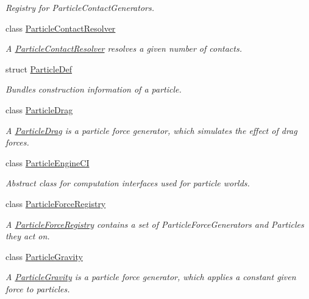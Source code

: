 \begin{DoxyCompactItemize}
\begin{DoxyCompactList}\small\item\em Registry for Particle\+Contact\+Generators. \end{DoxyCompactList}\item 
class \mbox{\hyperlink{classr3_1_1_particle_contact_resolver}{Particle\+Contact\+Resolver}}
\begin{DoxyCompactList}\small\item\em A \mbox{\hyperlink{classr3_1_1_particle_contact_resolver}{Particle\+Contact\+Resolver}} resolves a given number of contacts. \end{DoxyCompactList}\item 
struct \mbox{\hyperlink{structr3_1_1_particle_def}{Particle\+Def}}
\begin{DoxyCompactList}\small\item\em Bundles construction information of a particle. \end{DoxyCompactList}\item 
class \mbox{\hyperlink{classr3_1_1_particle_drag}{Particle\+Drag}}
\begin{DoxyCompactList}\small\item\em A \mbox{\hyperlink{classr3_1_1_particle_drag}{Particle\+Drag}} is a particle force generator, which simulates the effect of drag forces. \end{DoxyCompactList}\item 
class \mbox{\hyperlink{classr3_1_1_particle_engine_c_i}{Particle\+Engine\+CI}}
\begin{DoxyCompactList}\small\item\em Abstract class for computation interfaces used for particle worlds. \end{DoxyCompactList}\item 
class \mbox{\hyperlink{classr3_1_1_particle_force_registry}{Particle\+Force\+Registry}}
\begin{DoxyCompactList}\small\item\em A \mbox{\hyperlink{classr3_1_1_particle_force_registry}{Particle\+Force\+Registry}} contains a set of Particle\+Force\+Generators and Particles they act on. \end{DoxyCompactList}\item 
class \mbox{\hyperlink{classr3_1_1_particle_gravity}{Particle\+Gravity}}
\begin{DoxyCompactList}\small\item\em A \mbox{\hyperlink{classr3_1_1_particle_gravity}{Particle\+Gravity}} is a particle force generator, which applies a constant given force to particles. \end{DoxyCompactList}\item 

\end{DoxyCompactItemize}
